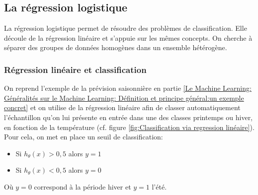 \subsection{La régression logistique}
\label{Le Machine Learning: Les différents algorithmes: La regression logistique}
La régression logistique permet de résoudre des problèmes de classification. Elle découle de la régression linéaire et s'appuie sur les mêmes concepts.
On cherche à séparer des groupes de données homogènes dans un ensemble hétérogène. 

\subsubsection{Régression linéaire et classification}
\label{Le Machine Learning: Les différents algorithmes: La regression logistique: Régression linéaire et classification}
On reprend l'exemple de la prévision saisonnière en partie \ref{Le Machine Learning: Généralités sur le Machine Learning: Définition et principe général:un exemple concret} et on utilise de la régression linéaire afin de classer automatiquement l'échantillon qu'on lui présente en entrée dans une des classes printemps ou hiver, en fonction de la température (cf. figure \ref{fig:Classification via regression linéaire}). 
Pour cela, on met en place un seuil de classification:
\begin{itemize}
	\item Si $h_\theta(x) > 0,5$ alors $y=1$
	\item Si $h_\theta(x) < 0,5$ alors $y=0$
\end{itemize}

Où $y = 0$ correspond à la période hiver et $y = 1$ l'été. 

